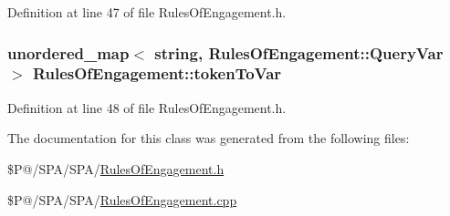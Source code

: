 Definition at line 47 of file Rules\-Of\-Engagement.\-h.

\hypertarget{class_rules_of_engagement_ab3e59955494f404502bf165417df74c9}{
\subsubsection[{token\-To\-Var}]{\setlength{\rightskip}{0pt plus 5cm}unordered\-\_\-map$<$ string, {\bf Rules\-Of\-Engagement\-::\-Query\-Var} $>$ Rules\-Of\-Engagement\-::token\-To\-Var\hspace{0.3cm}{\ttfamily [static]}}}\label{class_rules_of_engagement_ab3e59955494f404502bf165417df74c9}


Definition at line 48 of file Rules\-Of\-Engagement.\-h.



The documentation for this class was generated from the following files\-:\begin{DoxyCompactItemize}
\item 
\$\-P@/\-S\-P\-A/\-S\-P\-A/\hyperlink{_rules_of_engagement_8h}{Rules\-Of\-Engagement.\-h}\item 
\$\-P@/\-S\-P\-A/\-S\-P\-A/\hyperlink{_rules_of_engagement_8cpp}{Rules\-Of\-Engagement.\-cpp}\end{DoxyCompactItemize}
